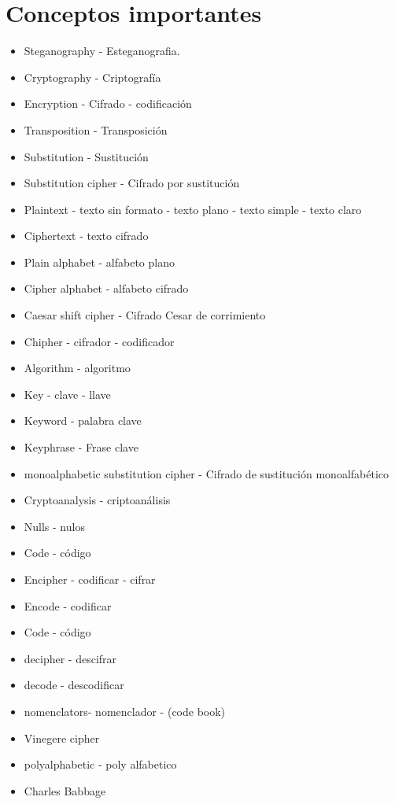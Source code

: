 	 \section{Conceptos importantes}
	 	\begin{itemize}
	 		\item Steganography - Esteganografia.
	 		\item Cryptography - Criptografía
	 		\item Encryption - Cifrado - codificación
	 		\item Transposition - Transposición
	 		\item Substitution - Sustitución
	 		\item Substitution cipher - Cifrado por sustitución
	 		\item Plaintext - texto sin formato - texto plano - texto simple - texto claro
	 		\item Ciphertext - texto cifrado
	 		\item Plain alphabet - alfabeto plano
	 		\item Cipher alphabet - alfabeto cifrado
	 		\item Caesar shift cipher - Cifrado Cesar de corrimiento
	 		\item Chipher - cifrador - codificador
	 		\item Algorithm - algoritmo
	 		\item Key - clave - llave
	 		\item Keyword - palabra clave
	 		\item Keyphrase - Frase clave
	 		\item monoalphabetic substitution cipher - Cifrado de sustitución monoalfabético
	 		\item Cryptoanalysis - criptoanálisis
	 		\item Nulls - nulos
	 		\item Code - código
	 		\item Encipher - codificar - cifrar
	 		\item Encode - codificar
	 		\item Code - código
	 		\item decipher - descifrar
	 		\item decode - descodificar
	 		\item nomenclators- nomenclador - (code book)
	 		\item Vinegere cipher
	 		\item polyalphabetic - poly alfabetico
	 		\item Charles Babbage
	 		
	 	\end{itemize}